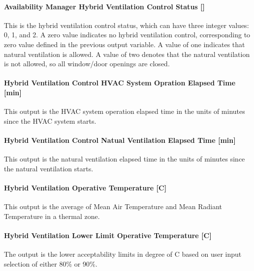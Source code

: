 \paragraph{Availability Manager Hybrid Ventilation Control Status {[]}}\label{availability-manager-hybrid-ventilation-control-status}

This is the hybrid ventilation control status, which can have three integer values: 0, 1, and 2. A zero value indicates no hybrid ventilation control, corresponding to zero value defined in the previous output variable. A value of one indicates that natural ventilation is allowed. A value of two denotes that the natural ventilation is not allowed, so all window/door openings are closed.

\paragraph{Hybrid Ventilation Control HVAC System Opration Elapsed Time {[min]}}\label{hybrid-ventilation-control-hvac-system-opration-elapsed-time}

This output is the HVAC system operation elapsed time in the units of minutes since the HVAC system starts.

\paragraph{Hybrid Ventilation Control Natual Ventilation Elapsed Time {[min]}}\label{hybrid-ventilation-control-natual-ventilation-elapsed-time}

This output is the natural ventilation elapsed time in the units of minutes since the natural ventilation starts.

\paragraph{Hybrid Ventilation Operative Temperature {[C]}}\label{hybrid-ventilation-operative-temperature}

This output is the average of Mean Air Temperature and Mean Radiant Temperature in a thermal zone.

\paragraph{Hybrid Ventilation Lower Limit Operative Temperature {[C]}}\label{hybrid-ventilation-lower-limit-operative-temperature}

The output is the lower acceptability limits in degree of C based on user input selection of either 80\% or 90\%.

